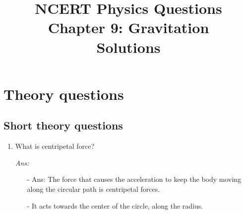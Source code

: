\documentclass[12pt]{article}
\title{NCERT Physics Questions \\ Chapter 9: Gravitation \\ Solutions}
\author{}
\date{}
\begin{document}
\maketitle

\section*{Theory questions}
\subsection*{Short theory questions}

\begin{enumerate}

	\item What is centripetal force? \\
		{\itshape Ans:
			\begin{itemize}
				\item[-] Ans: The force that causes the acceleration to keep the body moving
			along the circular path is centripetal forces.
				\item[-] It acts towards the center of the circle, along the radius.
			\end{itemize}
		}


\end{enumerate}
\end{document}
